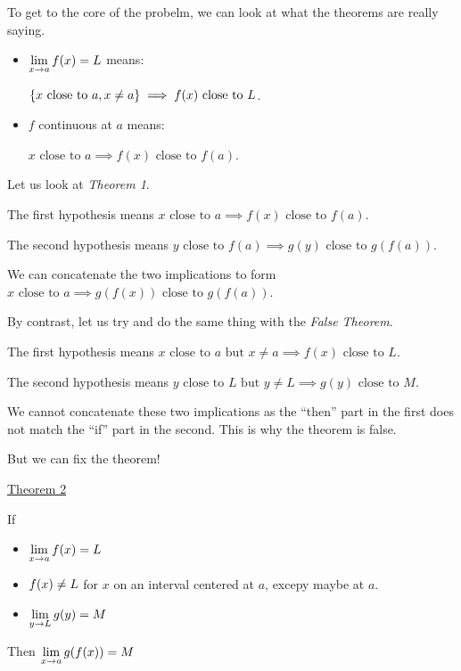 
To get to the core of the probelm, we can look at what the theorems are really saying.

\begin{itemize}
  \item \(\displaystyle \lim_{x \to a} f(x) = L\) means:

        \(\left\{x \text{ close to } a, x \neq a\right\} \implies f(x) \text{ close to } L\).

  \item \(f\) continuous at \(a\) means:

        \(x \text{ close to } a \implies f(x) \text{ close to } f(a)\).
\end{itemize}

Let us look at \emph{Theorem 1}.

The first hypothesis means \(x \text{ close to } a \implies f(x) \text{ close to } f(a)\).

The second hypothesis means \(y \text{ close to } f(a) \implies g(y) \text{ close to } g(f(a))\).

We can concatenate the two implications to form \(x \text{ close to } a \implies g(f(x)) \text{ close to } g(f(a))\).

By contrast, let us try and do the same thing with the \emph{False Theorem}.

The first hypothesis means \(x \text{ close to } a \text{ but } x \neq a \implies f(x) \text{ close to } L\).

The second hypothesis means \(y \text{ close to } L \text{ but } y \neq L \implies g(y) \text{ close to } M\).

We cannot concatenate these two implications as the ``then'' part in the first does not match the ``if'' part in the second. This is why the theorem is false.

But we can fix the theorem!

\begin{mdframed}
  \underline{Theorem 2}

  If
  \begin{itemize}
    \item \(\displaystyle \lim_{x \to a} f(x) = L\)
    \item \(\displaystyle f(x) \neq L\) for \(x\) on an interval centered at \(a\), excepy maybe at \(a\).
    \item \(\displaystyle \lim_{y \to L} g(y) = M\)
  \end{itemize}

  Then \(\displaystyle \lim_{x \to a} g(f(x)) = M\)
\end{mdframed}

